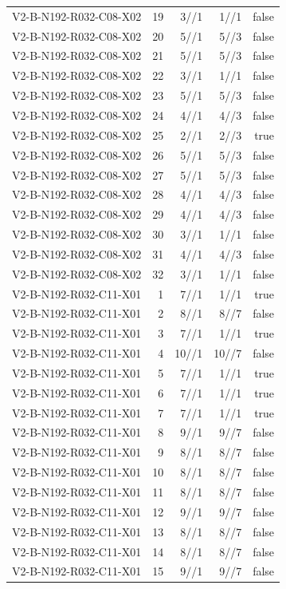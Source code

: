 {\begin{longtable}{lrrrr}
V2-B-N192-R032-C08-X02 & 19 & 3//1 & 1//1 & false \\
V2-B-N192-R032-C08-X02 & 20 & 5//1 & 5//3 & false \\
V2-B-N192-R032-C08-X02 & 21 & 5//1 & 5//3 & false \\
V2-B-N192-R032-C08-X02 & 22 & 3//1 & 1//1 & false \\
V2-B-N192-R032-C08-X02 & 23 & 5//1 & 5//3 & false \\
V2-B-N192-R032-C08-X02 & 24 & 4//1 & 4//3 & false \\
V2-B-N192-R032-C08-X02 & 25 & 2//1 & 2//3 & true \\
V2-B-N192-R032-C08-X02 & 26 & 5//1 & 5//3 & false \\
V2-B-N192-R032-C08-X02 & 27 & 5//1 & 5//3 & false \\
V2-B-N192-R032-C08-X02 & 28 & 4//1 & 4//3 & false \\
V2-B-N192-R032-C08-X02 & 29 & 4//1 & 4//3 & false \\
V2-B-N192-R032-C08-X02 & 30 & 3//1 & 1//1 & false \\
V2-B-N192-R032-C08-X02 & 31 & 4//1 & 4//3 & false \\
V2-B-N192-R032-C08-X02 & 32 & 3//1 & 1//1 & false \\
V2-B-N192-R032-C11-X01 & 1 & 7//1 & 1//1 & true \\
V2-B-N192-R032-C11-X01 & 2 & 8//1 & 8//7 & false \\
V2-B-N192-R032-C11-X01 & 3 & 7//1 & 1//1 & true \\
V2-B-N192-R032-C11-X01 & 4 & 10//1 & 10//7 & false \\
V2-B-N192-R032-C11-X01 & 5 & 7//1 & 1//1 & true \\
V2-B-N192-R032-C11-X01 & 6 & 7//1 & 1//1 & true \\
V2-B-N192-R032-C11-X01 & 7 & 7//1 & 1//1 & true \\
V2-B-N192-R032-C11-X01 & 8 & 9//1 & 9//7 & false \\
V2-B-N192-R032-C11-X01 & 9 & 8//1 & 8//7 & false \\
V2-B-N192-R032-C11-X01 & 10 & 8//1 & 8//7 & false \\
V2-B-N192-R032-C11-X01 & 11 & 8//1 & 8//7 & false \\
V2-B-N192-R032-C11-X01 & 12 & 9//1 & 9//7 & false \\
V2-B-N192-R032-C11-X01 & 13 & 8//1 & 8//7 & false \\
V2-B-N192-R032-C11-X01 & 14 & 8//1 & 8//7 & false \\
V2-B-N192-R032-C11-X01 & 15 & 9//1 & 9//7 & false \\

\end{longtable}}
